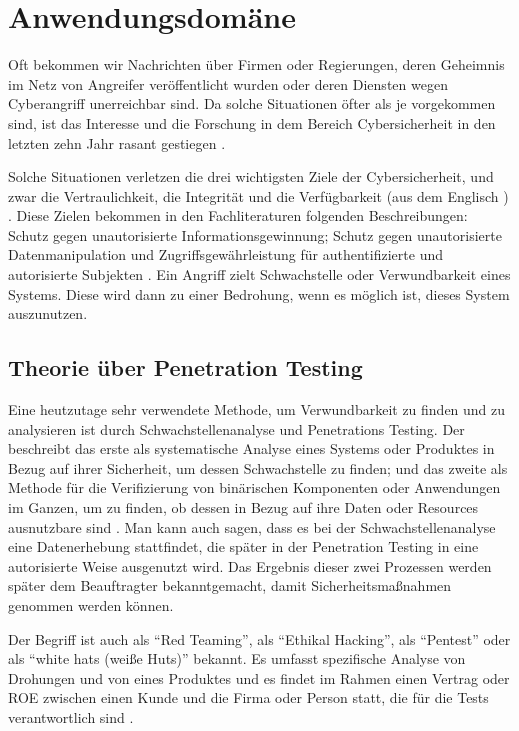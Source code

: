 \section{Anwendungsdomäne}

Oft bekommen wir Nachrichten über Firmen oder Regierungen, deren Geheimnis im Netz von Angreifer veröffentlicht wurden oder deren Diensten wegen \gls{Cyberangriff} unerreichbar sind. Da solche Situationen öfter als je vorgekommen sind, ist das Interesse und die Forschung in dem Bereich \gls{Cybersicherheit} in den letzten zehn Jahr rasant gestiegen \cite{opvenvpn}. 

Solche Situationen verletzen die drei wichtigsten Ziele der \gls{Cybersicherheit}, und zwar die Vertraulichkeit, die Integrität und die Verfügbarkeit (aus dem Englisch ) . Diese Zielen bekommen in den Fachliteraturen folgenden Beschreibungen: Schutz gegen unautorisierte Informationsgewinnung; Schutz gegen unautorisierte Datenmanipulation und Zugriffsgewährleistung für authentifizierte und autorisierte Subjekten \cite{Wendzel_It-Sicherheit}. Ein Angriff zielt \gls{Schwachstelle} oder \gls{Verwundbarkeit} eines Systems. Diese wird dann zu einer Bedrohung, wenn es möglich ist, dieses System auszunutzen.

\subsection{Theorie über Penetration Testing}

Eine heutzutage sehr verwendete Methode, um \gls{Verwundbarkeit} zu finden und zu analysieren ist durch Schwachstellenanalyse und Penetrations Testing. Der  beschreibt das erste als systematische Analyse eines Systems oder Produktes in Bezug auf ihrer Sicherheit, um dessen \gls{Schwachstelle} zu finden; und das zweite als Methode für die Verifizierung von binärischen Komponenten oder Anwendungen im Ganzen, um zu finden, ob dessen  in Bezug auf ihre Daten oder Resources ausnutzbare sind \cite{NIST_Definitionen}. Man kann auch sagen, dass es bei der Schwachstellenanalyse eine Datenerhebung stattfindet, die später in der Penetration Testing in eine autorisierte Weise ausgenutzt wird\cite{Goel_VulAsses_PenTest}. Das Ergebnis dieser zwei Prozessen werden später dem Beauftragter bekanntgemacht, damit Sicherheitsmaßnahmen genommen werden können.

Der Begriff ist auch als ``Red Teaming'', als ``Ethikal Hacking'', als ``Pentest'' oder als ``white hats (weiße Huts)'' bekannt. Es umfasst spezifische Analyse von Drohungen und von  eines Produktes und es findet im Rahmen einen Vertrag oder \gls{ROE} zwischen einen Kunde und die Firma oder Person statt, die für die Tests verantwortlich sind \cite{Bishop_PenTest}.

